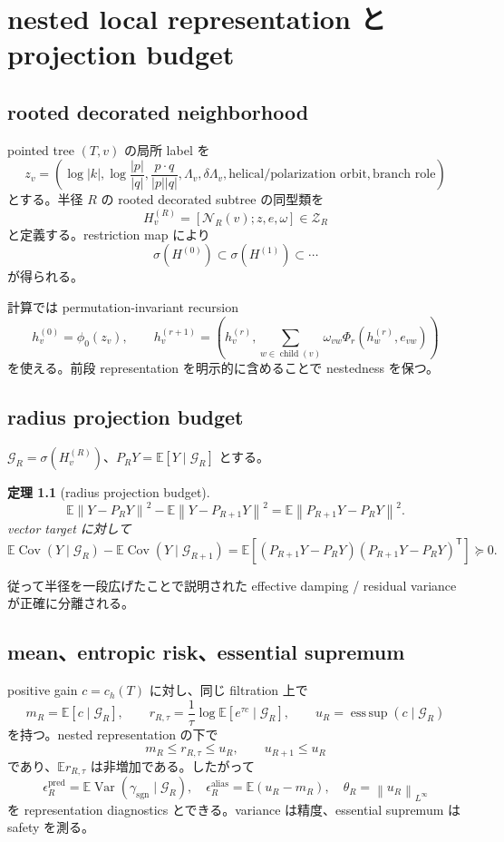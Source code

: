 \documentclass[11pt,a4paper,openany]{book}
\newtheorem{theorem}[definition]{定理}
\numberwithin{equation}{chapter}
\newcommand{\E}{\mathbb E}
\newcommand{\Cov}{\operatorname{Cov}}
\newcommand{\Var}{\operatorname{Var}}
\newcommand{\esssup}{\operatorname*{ess\,sup}}
\newcommand{\cG}{\mathcal G}
\newcommand{\cN}{\mathcal N}
\newcommand{\cZ}{\mathcal Z}
\newcommand{\norm}[1]{\left\lVert #1\right\rVert}
\begin{document}
\chapter{nested local representation と projection budget}
\section{rooted decorated neighborhood}
pointed tree $(T,v)$ の局所 label を
\[
z_v=
\left(
\log|k|,
\log\frac{|p|}{|q|},
\frac{p\cdot q}{|p||q|},
\Lambda_v,\delta\Lambda_v,
\text{helical/polarization orbit},
\text{branch role}
\right)
\]
とする。半径 $R$ の rooted decorated subtree の同型類を
\[
H_v^{(R)}=[\cN_R(v);z,e,\omega]\in\cZ_R
\]
と定義する。restriction map により
\[
\sigma(H^{(0)})
\subset\sigma(H^{(1)})
\subset\cdots
\]
が得られる。

計算では permutation-invariant recursion
\[
h_v^{(0)}=\phi_0(z_v),
\qquad
h_v^{(r+1)}
=\left(
h_v^{(r)},
\sum_{w\in\operatorname{child}(v)}
\omega_{vw}\Phi_r(h_w^{(r)},e_{vw})
\right)
\]
を使える。前段 representation を明示的に含めることで nestedness を保つ。

\section{radius projection budget}
$\cG_R=\sigma(H_v^{(R)})$、$P_RY=\E[Y\mid\cG_R]$ とする。

\begin{theorem}[radius projection budget]
\[
\boxed{
\E\norm{Y-P_RY}^2
-
\E\norm{Y-P_{R+1}Y}^2
=
\E\norm{P_{R+1}Y-P_RY}^2.}
\]
vector target に対して
\[
\E\Cov(Y\mid\cG_R)-\E\Cov(Y\mid\cG_{R+1})
=
\E\left[(P_{R+1}Y-P_RY)(P_{R+1}Y-P_RY)^{\mathsf T}\right]
\succeq0.
\]
\end{theorem}

従って半径を一段広げたことで説明された effective damping / residual variance が正確に分離される。

\section{mean、entropic risk、essential supremum}
positive gain $c=c_h(T)$ に対し、同じ filtration 上で
\[
m_R=\E[c\mid\cG_R],
\qquad
r_{R,\tau}=\frac1\tau\log\E[e^{\tau c}\mid\cG_R],
\qquad
u_R=\esssup(c\mid\cG_R)
\]
を持つ。nested representation の下で
\[
m_R\le r_{R,\tau}\le u_R,
\qquad
u_{R+1}\le u_R
\]
であり、$\E r_{R,\tau}$ は非増加である。したがって
\[
\epsilon_R^{\mathrm{pred}}=\E\Var(\gamma_{\mathrm{sgn}}\mid\cG_R),
\quad
\epsilon_R^{\mathrm{alias}}=\E(u_R-m_R),
\quad
\theta_R=\norm{u_R}_{L^\infty}
\]
を representation diagnostics とできる。variance は精度、essential supremum は safety を測る。
\end{document}
